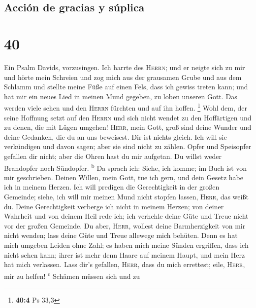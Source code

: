 \hypertarget{acciuxf3n-de-gracias-y-suxfaplica}{%
\subsection{Acción de gracias y
súplica}\label{acciuxf3n-de-gracias-y-suxfaplica}}

\hypertarget{section-39}{%
\section{40}\label{section-39}}

 Ein Psalm Davids, vorzusingen.  Ich harrte
des \textsc{Herrn}; und er neigte sich zu mir und hörte mein Schreien
 und zog mich aus der grausamen Grube und aus dem Schlamm
und stellte meine Füße auf einen Fels, dass ich gewiss treten kann;
 und hat mir ein neues Lied in meinen Mund gegeben, zu
loben unseren Gott. Das werden viele sehen und den \textsc{Herrn}
fürchten und auf ihn hoffen. \footnote{\textbf{40:4} Ps 33,3}
 Wohl dem, der seine Hoffnung setzt auf den \textsc{Herrn}
und sich nicht wendet zu den Hoffärtigen und zu denen, die mit Lügen
umgehen!  \textsc{Herr}, mein Gott, groß sind deine Wunder
und deine Gedanken, die du an uns beweisest. Dir ist nichts gleich. Ich
will sie verkündigen und davon sagen; aber sie sind nicht zu zählen.
 Opfer und Speisopfer gefallen dir nicht; aber die Ohren
hast du mir aufgetan. Du willst weder Brandopfer noch Sündopfer.
\textsuperscript{b}  Da sprach ich: Siehe, ich komme; im
Buch ist von mir geschrieben.  Deinen Willen, mein Gott,
tue ich gern, und dein Gesetz habe ich in meinem Herzen. 
Ich will predigen die Gerechtigkeit in der großen Gemeinde; siehe, ich
will mir meinen Mund nicht stopfen lassen, \textsc{Herr}, das weißt du.
 Deine Gerechtigkeit verberge ich nicht in meinem Herzen;
von deiner Wahrheit und von deinem Heil rede ich; ich verhehle deine
Güte und Treue nicht vor der großen Gemeinde.  Du aber,
\textsc{Herr}, wollest deine Barmherzigkeit von mir nicht wenden; lass
deine Güte und Treue allewege mich behüten.  Denn es hat
mich umgeben Leiden ohne Zahl; es haben mich meine Sünden ergriffen,
dass ich nicht sehen kann; ihrer ist mehr denn Haare auf meinem Haupt,
und mein Herz hat mich verlassen.  Lass dir's gefallen,
\textsc{Herr}, dass du mich errettest; eile, \textsc{Herr}, mir zu
helfen! \textsuperscript{c}  Schämen müssen sich und zu
